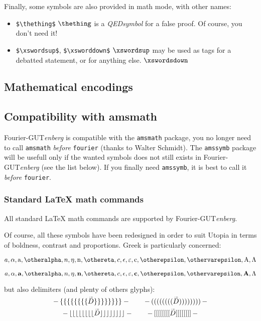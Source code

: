 \documentclass[a4paper,11pt]{article}
\newcommand{\fourier}{Fourier-GUT\textit{enberg}}
\begin{document}
Finally, some symbols are also provided in math mode, with other names:
\begin{itemize}
\item\verb=$\thething$= $\thething$ is a \emph{QEDsymbol} 
for a false proof. Of course, you don't need it!
\item\verb=$\xswordsup$=, \verb=$\xsworddown$= $\xswordsup$ may be used as tags for a debatted statement, or for anything else. $\xswordsdown$
\end{itemize}

\subsection{Mathematical encodings}
\subsection*{Compatibility with amsmath}
\fourier{} is compatible with the \texttt{amsmath} package, you no longer need to call 
\texttt{amsmath} \emph{before} \texttt{fourier} (thanks to Walter Schmidt).
The \texttt{amssymb} package will be usefull only if the wanted symbols does not still exists
 in \fourier{} (see the list below). If you finally need \texttt{amssymb}, 
 it is best to call it \emph{before} \texttt{fourier}.
\subsubsection*{Standard \LaTeX{} math commands} 
All standard \LaTeX{} math commands are supported by \fourier{}.

Of course, all these symbols have been redesigned in order to suit Utopia in 
terms of boldness, contrast and proportions. Greek is particularly concerned:

\vspace{-40pt}
{\Huge
\[a, \alpha, \mathrm{a}, \otheralpha, n, \eta, \mathrm{n}, \othereta, 
c, \epsilon, \varepsilon, \mathrm{c}, \otherepsilon, 
\othervarepsilon, \mathrm{A}, \Lambda\]\par\vspace{-12pt}

\vspace{-40pt}
\boldmath\bfseries
\[a, \alpha, \mathbf{a}, \otheralpha, n, \eta, \mathbf{n}, \othereta, 
c, \epsilon, \varepsilon, \mathbf{c}, \otherepsilon, 
\othervarepsilon, \mathbf{A}, \Lambda\]\par
}
\noindent but also delimiters (and plenty of others glyphs):
\def\testdelim#1#2{%
  - \left#1\left#1\left#1\left#1\left#1\left#1\left#1\left#1 
  \smash{\widetilde{D}} 
  \right#2\right#2\right#2\right#2\right#2\right#2\right#2\right#2 -}
\begingroup
\delimitershortfall-1pt
\begin{displaymath}
  \testdelim\{\} 
  \qquad 
  \testdelim()
\end{displaymath}
\begin{displaymath}
\testdelim\lfloor\rfloor
\qquad
\testdelim[]
\end{displaymath}
\endgroup
\end{document}
